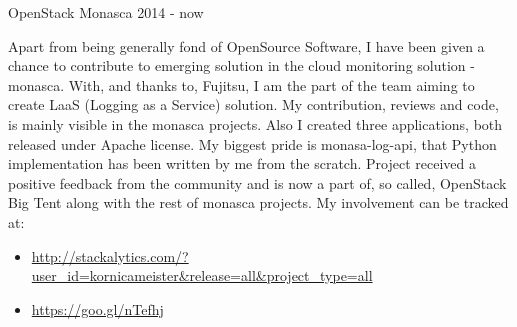 
\begin{cventries}

    \cventry
    {OpenStack}
    {Monasca}
    {2014 - now}
    {}
    {
      Apart from being generally fond of OpenSource Software, I have been given a chance to contribute to
      emerging solution in the cloud monitoring solution - monasca.
      With, and thanks to, Fujitsu, I am the part of the team aiming to create LaaS (Logging as a Service) solution.
      My contribution, reviews and code, is mainly visible in the monasca projects.
      Also I created three applications, both released under Apache license.
      \linebreak
      \linebreak
      My biggest pride is monasa-log-api, that Python implementation has been written by me from the scratch.
      Project received a positive feedback from the community and is now a part of, so called,
      OpenStack Big Tent along with the rest of monasca projects.
      My involvement can be tracked at:
      \begin{itemize}
        \item \url{http://stackalytics.com/?user_id=kornicameister&release=all&project_type=all}
        \item \url{https://goo.gl/nTefhj}
      \end{itemize}
    }

\end{cventries}
